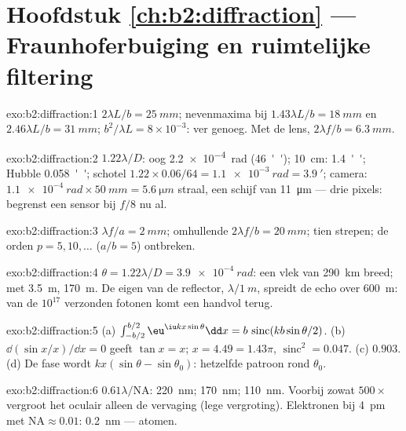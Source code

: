 \section*{Hoofdstuk \ref{ch:b2:diffraction} --- Fraunhoferbuiging en
ruimtelijke filtering}

\begin{solution}{exo:b2:diffraction:1}
$2\lambda L/b = \qty{25}{mm}$; nevenmaxima bij $1.43\lambda L/b = \qty{18}{mm}$ en
$2.46\lambda L/b = \qty{31}{mm}$; 
$b^2/\lambda L = 8 \times 10^{-3}$: ver
genoeg. Met de lens, $2\lambda f/b = \qty{6.3}{mm}$.
\end{solution}

\begin{solution}{exo:b2:diffraction:2}
$1.22\lambda/D$: oog \qty{2.2e-4}{rad} (\qty{46}{''}); \qty{10}{cm}:
\qty{1.4}{''}; Hubble
\qty{0.058}{''}; schotel
$1.22 \times 0.06/64 = \qty{1.1e-3}{rad} = \qty{3.9}{'}$; camera:
$\qty{1.1e-4}{rad} \times \qty{50}{mm} = \qty{5.6}{\micro m}$ straal, een
schijf van \qty{11}{\micro m} ---
drie pixels:  begrenst een sensor bij $f/8$ nu al.
\end{solution}

\begin{solution}{exo:b2:diffraction:3}
$\lambda f/a = \qty{2}{mm}$; omhullende $2\lambda f/b = \qty{20}{mm}$; tien
strepen; de orden
$p = 5, 10, \dots$ ($a/b = 5$) ontbreken.
\end{solution}

\begin{solution}{exo:b2:diffraction:4}
$\theta = 1.22\lambda/D = \qty{3.9e-4}{rad}$: een vlek van \qty{290}{km}
breed; met \qty{3.5}{m},
\qty{170}{m}. De eigen  van de reflector, $\lambda/\qty{1}{m}$, spreidt de
echo over \qty{600}{m}: van de $10^{17}$ verzonden fotonen komt een handvol terug.
\end{solution}

\begin{solution}{exo:b2:diffraction:5}
(a)
$\int_{-b/2}^{b/2}\eu^{\iu kx\sin\theta}\dd x = b\,\operatorname{sinc}(kb\sin\theta/2)$.
(b)
$\dd(\sin x/x)/\dd x = 0$ geeft $\tan x = x$; $x = 4.49 = 1.43\pi$,
$\operatorname{sinc}^2 =
0.047$. (c) $0.903$. (d) De fase wordt
$kx(\sin\theta - \sin\theta_0)$: hetzelfde
patroon rond $\theta_0$.
\end{solution}

\begin{solution}{exo:b2:diffraction:6}
$0.61\lambda/\mathrm{NA}$: \qty{220}{nm}; \qty{170}{nm}; \qty{110}{nm}.
Voorbij zowat $500\times$
vergroot het oculair alleen de vervaging (lege vergroting). Elektronen
bij \qty{4}{pm} met $\mathrm{NA} \approx 0.01$: \qty{0.2}{nm} --- atomen.
\end{solution}

